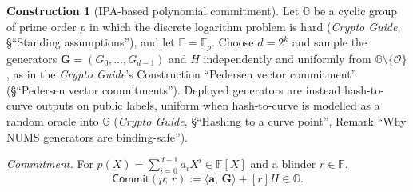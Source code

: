 \documentclass[11pt,a4paper]{article}
\theoremstyle{definition}
\newtheorem{construction}[theorem]{Construction}
\newcommand{\F}{\mathbb{F}}
\newcommand{\G}{\mathbb{G}}
\newcommand{\ip}[2]{\langle #1,\, #2 \rangle}
\newcommand{\Comm}{\mathsf{Commit}}
\begin{document}
\begin{construction}[IPA-based polynomial commitment]
\label{con:ipa-commit}
Let $\G$ be a cyclic group of prime order $p$ in which the discrete
logarithm problem is hard (\emph{Crypto Guide}, \S``Standing
assumptions''), and let $\F = \F_p$. Choose $d = 2^k$ and sample the
generators $\mathbf G = (G_0, \dots, G_{d-1})$ and $H$ independently and
uniformly from $\G \setminus \{\mathcal O\}$, as in the \emph{Crypto
Guide}'s Construction ``Pedersen vector commitment'' (\S``Pedersen
vector commitments''). Deployed generators are instead hash-to-curve
outputs on public labels, uniform when hash-to-curve is modelled as a
random oracle into $\G$ (\emph{Crypto Guide}, \S``Hashing to a curve
point'', Remark ``Why NUMS generators are binding-safe'').

\emph{Commitment.} For $p(X) = \sum_{i=0}^{d-1} a_i X^i \in \F[X]$ and a
blinder $r \in \F$,
\[
\Comm(p;\, r) := \ip{\mathbf a}{\mathbf G} + [r]H \in \G .
\]


\end{construction}
\end{document}
